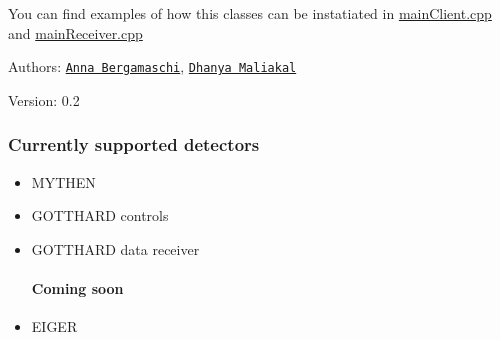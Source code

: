 You can find examples of how this classes can be instatiated in \hyperlink{mainClient_8cpp}{main\-Client.cpp} and \hyperlink{mainReceiver_8cpp}{main\-Receiver.cpp}

\begin{Desc}
\item[Authors:]\href{mailto:anna.bergamaschi@psi.ch}{\tt Anna Bergamaschi}, \href{mailto:dhanya.maliakal@psi.ch}{\tt Dhanya Maliakal} \end{Desc}
\begin{Desc}
\item[Version:]0.2 \subsubsection*{Currently supported detectors}\end{Desc}
\begin{itemize}
\item MYTHEN \item GOTTHARD controls \item GOTTHARD data receiver \paragraph*{Coming soon}\end{itemize}
\begin{itemize}
\item EIGER \end{itemize}
